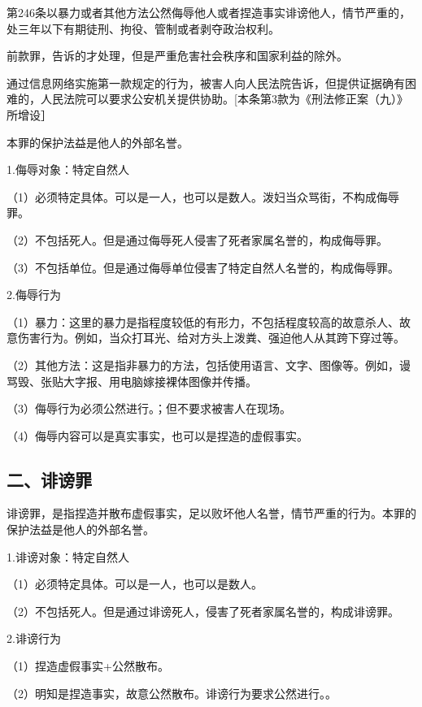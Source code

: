 第246条以暴力或者其他方法公然侮辱他人或者捏造事实诽谤他人，情节严重的，处三年以下有期徒刑、拘役、管制或者剥夺政治权利。

前款罪，告诉的才处理，但是严重危害社会秩序和国家利益的除外。

通过信息网络实施第一款规定的行为，被害人向人民法院告诉，但提供证据确有困难的，人民法院可以要求公安机关提供协助。[本条第3款为《刑法修正案（九）》所增设］

本罪的保护法益是他人的外部名誉。

1.侮辱对象：特定自然人

（1）必须特定具体。可以是一人，也可以是数人。泼妇当众骂街，不构成侮辱罪。

（2）不包括死人。但是通过侮辱死人侵害了死者家属名誉的，构成侮辱罪。

（3）不包括单位。但是通过侮辱单位侵害了特定自然人名誉的，构成侮辱罪。

2.侮辱行为

（1）暴力：这里的暴力是指程度较低的有形力，不包括程度较高的故意杀人、故意伤害行为。例如，当众打耳光、给对方头上泼粪、强迫他人从其跨下穿过等。

（2）其他方法：这是指非暴力的方法，包括使用语言、文字、图像等。例如，谩骂毁、张贴大字报、用电脑嫁接裸体图像并传播。

（3）侮辱行为必须公然进行。；但不要求被害人在现场。

（4）侮辱内容可以是真实事实，也可以是捏造的虚假事实。

\subsection*{二、诽谤罪}

诽谤罪，是指捏造并散布虚假事实，足以败坏他人名誉，情节严重的行为。本罪的保护法益是他人的外部名誉。

1.诽谤对象：特定自然人

（1）必须特定具体。可以是一人，也可以是数人。

（2）不包括死人。但是通过诽谤死人，侵害了死者家属名誉的，构成诽谤罪。

2.诽谤行为

（1）捏造虚假事实+公然散布。

（2）明知是捏造事实，故意公然散布。诽谤行为要求公然进行。。



